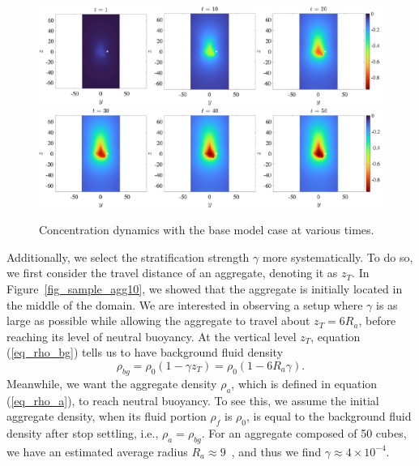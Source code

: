 \begin{figure}[ht]
	\begin{center}
		\includegraphics[scale=0.65]{./figures/fig_NC50_snaps_pt1.pdf}
		\includegraphics[scale=0.65]{./figures/fig_NC50_snaps_pt2.pdf}
	\caption{Concentration dynamics with the base model case at various times.}
	\label{fig_NC50_snaps_all}
\end{center}
\end{figure}
\par
Additionally, we select the stratification strength $\gamma$ more systematically. 
To do so, we first consider the travel distance of an aggregate, denoting it as $z_T$. In Figure~\ref{fig_sample_agg10}, we showed that the aggregate is initially located in the middle of the domain. We are interested in observing a setup where $\gamma$ is as large as possible while allowing the aggregate to travel about $z_T = 6R_a$, before
reaching its level of neutral buoyancy.
At the vertical level $z_T$, equation (\ref{eq_rho_bg}) tells us to have background fluid density 
\begin{equation}
	\rho_{bg} = \rho_0 (1-\gamma z_T) =	\rho_0 (1 - 6R_a \gamma).
	\label{eq_compute_G}
\end{equation}
Meanwhile, we want the aggregate density $\rho_a$, which is defined in equation (\ref{eq_rho_a}), to reach neutral buoyancy. To see this, we assume the initial aggregate density, when its fluid portion $\rho_f$ is $\rho_0$, is equal to the background fluid density after stop settling, i.e., $\rho_a = \rho_{bg}$. 
For an aggregate composed of 50 cubes, we have an estimated average radius $R_a \approx 9$~\cite{yoo_hydrodynamic_2020}, and thus we find $\gamma \approx 4 \times 10^{-4}$.  
